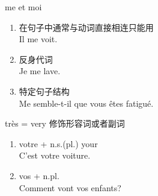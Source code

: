 \documentclass[../templates/main.tex]{subfiles}
\begin{document}
\begin{grammar}{me et moi}
	\begin{enumerate}
		\item 在句子中通常与动词直接相连只能用\\
		      Il me voit.
		\item 反身代词\\
		      Je me lave.
		\item 特定句子结构\\
		      Me semble-t-il que vous êtes fatigué.
	\end{enumerate}
\end{grammar}
\begin{sentence}\label{se:Tbbb}
	\begin{grammar}{très}
		= very 修饰形容词或者副词
	\end{grammar}
\end{sentence}
\begin{sentence}\label{se:Vmdv}
	\begin{enumerate}
		\item votre + n.s.(pl.) your \\
		      C'est votre voiture.
		\item vos + n.pl.\\
		      Comment vont vos enfants?
	\end{enumerate}
\end{sentence}
\end{document}
